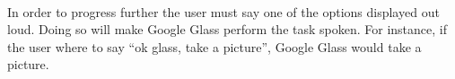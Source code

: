 \\
In order to progress further the user must say one of the options displayed out loud. Doing so will make Google Glass perform the task spoken. For instance, if the user where to say ``ok glass, take a picture'', Google Glass would take a picture.




